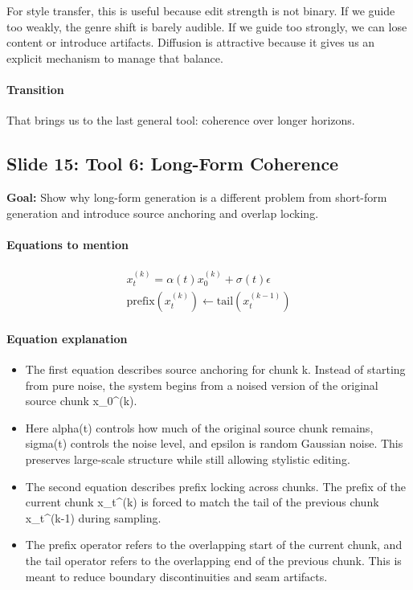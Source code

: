 \documentclass[11pt]{article}
\begin{document}
For style transfer, this is useful because edit strength is not binary. If we guide too weakly, the genre shift is barely audible. If we guide too strongly, we can lose content or introduce artifacts. Diffusion is attractive because it gives us an explicit mechanism to manage that balance.

\paragraph{Transition}
That brings us to the last general tool: coherence over longer horizons.

\subsection*{Slide 15: Tool 6: Long-Form Coherence}
\textbf{Goal:} Show why long-form generation is a different problem from short-form generation and introduce source anchoring and overlap locking.
\paragraph{Equations to mention}
\begin{align*}
x_t^{(k)}=\alpha(t)x_0^{(k)}+\sigma(t)\epsilon\\
\mathrm{prefix}(x_t^{(k)})\leftarrow \mathrm{tail}(x_t^{(k-1)})
\end{align*}
\paragraph{Equation explanation}
\begin{itemize}
\item The first equation describes source anchoring for chunk k. Instead of starting from pure noise, the system begins from a noised version of the original source chunk x\_0\textasciicircum{}(k).
\item Here alpha(t) controls how much of the original source chunk remains, sigma(t) controls the noise level, and epsilon is random Gaussian noise. This preserves large-scale structure while still allowing stylistic editing.
\item The second equation describes prefix locking across chunks. The prefix of the current chunk x\_t\textasciicircum{}(k) is forced to match the tail of the previous chunk x\_t\textasciicircum{}(k-1) during sampling.
\item The prefix operator refers to the overlapping start of the current chunk, and the tail operator refers to the overlapping end of the previous chunk. This is meant to reduce boundary discontinuities and seam artifacts.
\end{itemize}
\end{document}
